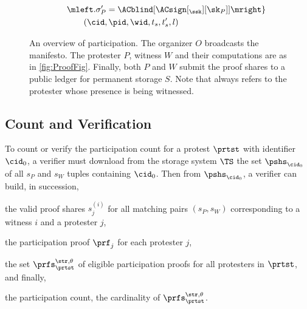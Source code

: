 \begin{figure}
\begin{minipage}{\linewidth}
\begin{align*}
        & \qquad \mleft. \sigma_P' = \ACblind[\ACsign[_{\ssk}][\sk_P]] \mright\} 
        \\
        & \qquad\qquad (\cid, \pid, \wid, t_s, t_s', l)
    \end{align*}
  \end{minipage}
  \caption{%
    An overview of \CROCUS participation.\@
    The organizer \(O\) broadcasts the manifesto.
    The protester \(P\), witness \(W\) and their computations are as in \cref{fig:ProofFig}.
    Finally, both \(P\) and \(W\) submit the proof shares to a
   public ledger for permanent storage \(S\). Note that \pid  always refers to the
    protester whose presence is being witnessed.
  }%
  \label{fig:ProtocolOverview}
\end{figure}


\subsection{Count and Verification}%
\label{ProtocolVerification}



To count or verify the participation count for a protest \(\prtst\) with identifier 
\(\cid_0\), a verifier must download from the storage system \(\TS\) the set 
\(\pshs_{\cid_0}\) of all \(s_P\) and \(s_W\) tuples containing \(\cid_0\).
Then from \(\pshs_{\cid_0}\), a verifier can build, in succession,
\begin{enumerate*}
\item the valid proof shares \(s_j^{(i)}\) for all matching pairs \((s_P, 
    s_W)\) corresponding to a witness \(i\) and a protester \(j\),
\item the participation proof \(\prf_{j}\) for each protester \(j\),
\item the set \(\prfs_{\prtst}^{\str,\theta}\) of eligible participation proofs 
  for all protesters in \(\prtst\), and finally,
\item the participation count, \ie the cardinality of 
  \(\prfs_\prtst^{\str,\theta}\).
\end{enumerate*}

